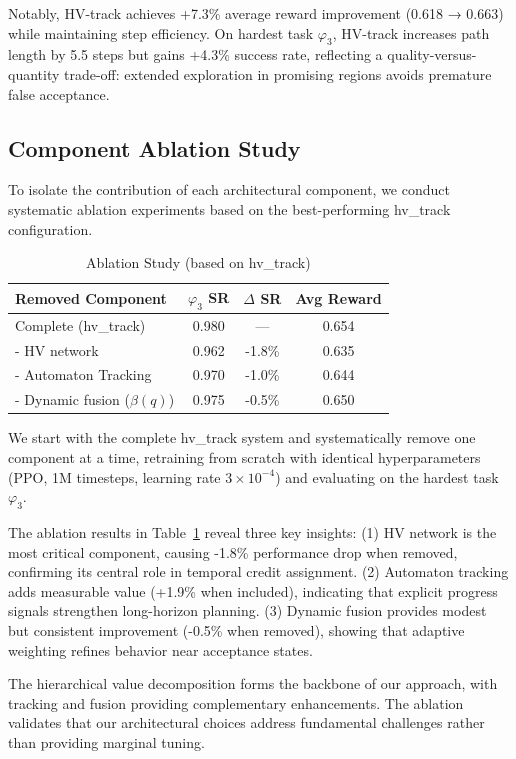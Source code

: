 \documentclass{article}
\begin{document}
Notably, HV-track achieves +7.3\% average reward improvement (0.618 → 0.663) while maintaining step efficiency. On hardest task $\varphi_3$, HV-track increases path length by 5.5 steps but gains +4.3\% success rate, reflecting a quality-versus-quantity trade-off: extended exploration in promising regions avoids premature false acceptance.

\subsection{Component Ablation Study}
\label{app:ablation}

To isolate the contribution of each architectural component, we conduct systematic ablation experiments based on the best-performing hv\_track configuration.

\begin{table}[h]
\centering
\caption{Ablation Study (based on hv\_track)}
\label{tab:ablation}
\begin{tabular}{@{}lccc@{}}
\toprule
\textbf{Removed Component} & \textbf{$\varphi_3$ SR} & \textbf{$\Delta$ SR} & \textbf{Avg Reward} \\ \midrule
Complete (hv\_track) & 0.980 & --- & 0.654 \\
- HV network & 0.962 & -1.8\% & 0.635 \\
- Automaton Tracking & 0.970 & -1.0\% & 0.644 \\
- Dynamic fusion ($\beta(q)$) & 0.975 & -0.5\% & 0.650 \\ \bottomrule
\end{tabular}
\end{table}

We start with the complete hv\_track system and systematically remove one component at a time, retraining from scratch with identical hyperparameters (PPO, 1M timesteps, learning rate $3 \times 10^{-4}$) and evaluating on the hardest task $\varphi_3$.

The ablation results in Table~\ref{tab:ablation} reveal three key insights: (1) HV network is the most critical component, causing -1.8\% performance drop when removed, confirming its central role in temporal credit assignment. (2) Automaton tracking adds measurable value (+1.9\% when included), indicating that explicit progress signals strengthen long-horizon planning. (3) Dynamic fusion provides modest but consistent improvement (-0.5\% when removed), showing that adaptive weighting refines behavior near acceptance states.

The hierarchical value decomposition forms the backbone of our approach, with tracking and fusion providing complementary enhancements. The ablation validates that our architectural choices address fundamental challenges rather than providing marginal tuning.
\end{document}
